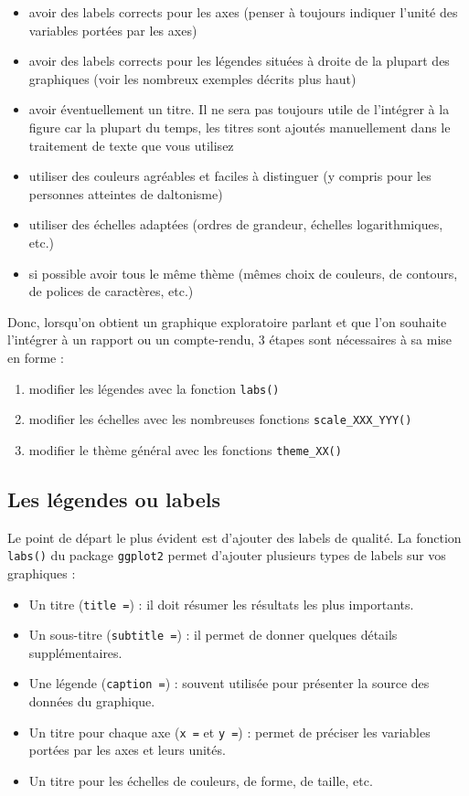 \documentclass[
  a4paper,
  DIV=11,
  numbers=noendperiod,
  oneside]{scrreprt}
\providecommand{\tightlist}{%
  \setlength{\itemsep}{0pt}\setlength{\parskip}{0pt}}\usepackage{longtable,booktabs,array}
\begin{document}
\begin{itemize}
\tightlist
\item
  avoir des labels corrects pour les axes (penser à toujours indiquer
  l'unité des variables portées par les axes)
\item
  avoir des labels corrects pour les légendes situées à droite de la
  plupart des graphiques (voir les nombreux exemples décrits plus haut)
\item
  avoir éventuellement un titre. Il ne sera pas toujours utile de
  l'intégrer à la figure car la plupart du temps, les titres sont
  ajoutés manuellement dans le traitement de texte que vous utilisez
\item
  utiliser des couleurs agréables et faciles à distinguer (y compris
  pour les personnes atteintes de daltonisme)
\item
  utiliser des échelles adaptées (ordres de grandeur, échelles
  logarithmiques, etc.)
\item
  si possible avoir tous le même thème (mêmes choix de couleurs, de
  contours, de polices de caractères, etc.)
\end{itemize}

Donc, lorsqu'on obtient un graphique exploratoire parlant et que l'on
souhaite l'intégrer à un rapport ou un compte-rendu, 3 étapes sont
nécessaires à sa mise en forme :

\begin{enumerate}
\def\labelenumi{\arabic{enumi}.}
\tightlist
\item
  modifier les légendes avec la fonction \texttt{labs()}
\item
  modifier les échelles avec les nombreuses fonctions
  \texttt{scale\_XXX\_YYY()}
\item
  modifier le thème général avec les fonctions \texttt{theme\_XX()}
\end{enumerate}

\subsection{Les légendes ou labels}\label{les-luxe9gendes-ou-labels}

Le point de départ le plus évident est d'ajouter des labels de qualité.
La fonction \texttt{labs()} du package \texttt{ggplot2} permet d'ajouter
plusieurs types de labels sur vos graphiques :

\begin{itemize}
\tightlist
\item
  Un titre (\texttt{title\ =}) : il doit résumer les résultats les plus
  importants.
\item
  Un sous-titre (\texttt{subtitle\ =}) : il permet de donner quelques
  détails supplémentaires.
\item
  Une légende (\texttt{caption\ =}) : souvent utilisée pour présenter la
  source des données du graphique.
\item
  Un titre pour chaque axe (\texttt{x\ =} et \texttt{y\ =}) : permet de
  préciser les variables portées par les axes et leurs unités.
\item
  Un titre pour les échelles de couleurs, de forme, de taille, etc.
\end{itemize}
\end{document}
